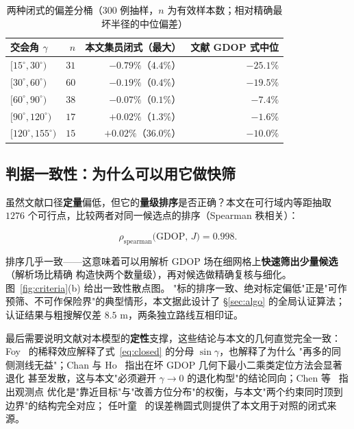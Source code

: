 \begin{table}[H]
  \centering
  \caption{两种闭式的偏差分桶（$300$ 例抽样，$n$ 为有效样本数；相对精确最坏半径的中位偏差）}
  \label{tab:buckets}
  \begin{tabular}{lrrr}
    \toprule
    \textbf{交会角 $\gamma$} & $n$ & \textbf{本文集员闭式（最大）} & \textbf{文献 GDOP 式中位} \\
    \midrule
    $[15^\circ,30^\circ)$   & $31$  & $-0.79\%$（$4.4\%$）   & $-25.1\%$ \\
    $[30^\circ,60^\circ)$   & $60$  & $-0.19\%$（$0.4\%$）   & $-19.5\%$ \\
    $[60^\circ,90^\circ)$   & $38$  & $-0.07\%$（$0.1\%$）   & $-7.4\%$ \\
    $[90^\circ,120^\circ)$  & $17$  & $+0.02\%$（$1.3\%$）   & $-1.6\%$ \\
    $[120^\circ,155^\circ)$ & $15$  & $+0.02\%$（$36.0\%$）  & $-10.0\%$ \\
    \bottomrule
  \end{tabular}
\end{table}

\subsection{判据一致性：为什么可以用它做快筛}

虽然文献口径\textbf{定量}偏低，但它的\textbf{量级排序}是否正确？本文在可行域内等距抽取
$1276$ 个可行点，比较两者对同一候选点的排序（Spearman 秩相关）：

\begin{equation}
  \rho_{\mathrm{spearman}}\bigl(\mathrm{GDOP},\,J\bigr)=0.998.
  \label{eq:spearman}
\end{equation}

排序几乎一致——这意味着可以用解析 GDOP 场在细网格上\textbf{快速筛出少量候选}（解析场比精确
构造快两个数量级），再对候选做精确复核与细化。图~\ref{fig:criteria}(b) 给出一致性散点图。
"标的排序一致、绝对标定偏低"正是"可作预筛、不可作保险界"的典型情形，本文据此设计了
§\ref{sec:algo} 的全局认证算法；认证结果与粗搜解仅差 $8.5$ m，两条独立路线互相印证。

最后需要说明文献对本模型的\textbf{定性}支撑，这些结论与本文的几何直觉完全一致：
Foy~\cite{foy1976} 的稀释效应解释了式~\eqref{eq:closed} 的分母 $\sin\gamma$，也解释了为什么
"再多的同侧测线无益"；Chan 与 Ho~\cite{chan1994} 指出在坏 GDOP 几何下最小二乘类定位方法会显著退化
甚至发散，这与本文"必须避开 $\gamma\to0$ 的退化构型"的结论同向；Chen 等~\cite{chen2009} 指出观测点
优化是"靠近目标"与"改善方位分布"的权衡，与本文"两个约束同时顶到边界"的结构完全对应；
任叶童~\cite{ren2016} 的误差椭圆式则提供了本文用于对照的闭式来源。

